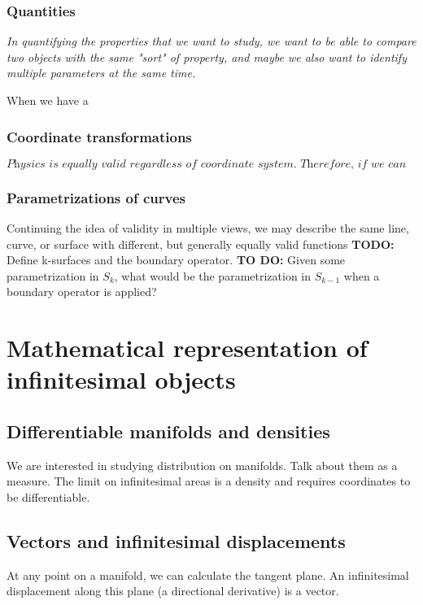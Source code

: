 \documentclass{book}
\begin{document}
\subsection{Quantities}
\emph{In quantifying the properties that we want to study, we want to be able to compare two objects with the same "sort" of property, and maybe we also want to identify multiple parameters at the same time.}

When we have a 
\subsection{Coordinate transformations}
$\textit{Physics is equally valid regardless of coordinate system. Therefore, if we can describe a physical phenomenon in one frame of reference, we should be able to convert that description into another frame of reference. }$
 


\subsection{Parametrizations of curves}
Continuing the idea of validity in multiple views, we may describe the same line, curve, or surface with different, but generally equally valid functions
\textbf{TODO: } Define k-surfaces and the boundary operator.
\textbf{TO DO:} Given some parametrization in $S_{k}$, what would be the parametrization in $S_{k-1}$ when a boundary operator is applied?

\chapter{Mathematical representation of infinitesimal objects}

\section{Differentiable manifolds and densities}
We are interested in studying distribution on manifolds. Talk about them as a measure. The limit on infinitesimal areas is a density and requires coordinates to be differentiable.

\section{Vectors and infinitesimal displacements}
At any point on a manifold, we can calculate the tangent plane. An infinitesimal displacement along this plane (a directional derivative) is a vector. 
\end{document}
